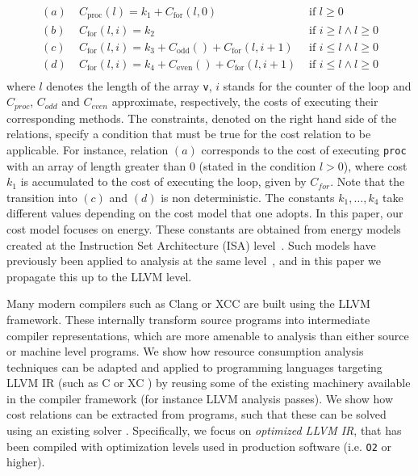 \documentclass[9pt,preprint]{sigplanconf}
\newcommand{\mathspace}[1]{\ensuremath{#1}\xspace}
\newcommand{\CR}[1]{\mathspace{C_{\operatorname{#1}}}}
\begin{document}
\begin{align*}
(a)&\phantom .\CR{proc}(l)=k_1+\CR{for}(l,0) &\text{ if }l\geq 0\\
(b)&\phantom .\CR{for}(l,i)=k_2         &\text{ if }i\geq l \wedge l\geq 0\\
(c)&\phantom .\CR{for}(l,i)=k_3+\CR{odd}() + \CR{for}(l,i+1) &\text{ if }i\leq l \wedge l\geq 0\\
(d)&\phantom .\CR{for}(l,i)=k_4+\CR{even}() + \CR{for}(l,i+1) &\text{ if }i\leq l \wedge l\geq 0\\
\end{align*}
where $l$ denotes the length of the array \texttt{v}, $i$ stands for the counter of the
loop and $C_{proc}$, $C_{odd}$ and $C_{even}$ approximate, respectively, the
costs of executing their corresponding methods. The constraints, denoted on the
right hand side of the relations, specify a condition that must be true for the
cost relation to be applicable. For instance, relation $(a)$
corresponds to the cost of executing \texttt{proc} with an array of length
greater than 0 (stated in the condition $l > 0$), where cost $k_1$ is
accumulated to the cost of executing the loop, given by $C_{for}$. Note that the
transition into $(c)$ and $(d)$ is non deterministic. The constants
$k_1,\ldots,k_4$ take different values depending on the cost model that one
adopts. In this paper, our cost model focuses on energy. These constants are
obtained from energy models created at the Instruction Set Architecture (ISA)
level~\cite{Kerrison13}. Such models have previously been applied to analysis at
the same level~\cite{NMHLFM08, isa-energy-lopstr13}, and in this paper we
propagate this up to the LLVM level.

Many modern compilers such as Clang or XCC are built using the LLVM framework. These
internally transform source programs into intermediate compiler representations,
which are more amenable to analysis than either source or machine level
programs. We show
how resource consumption analysis techniques can be adapted and applied to
programming languages targeting LLVM IR (such as C or XC \cite{xc}) by reusing some of the
existing machinery available in the compiler framework (for
instance LLVM analysis passes).
We show how cost relations  can be extracted from programs, such that these can
be solved using an existing solver \cite{AlbertAGP11a}. Specifically, we focus on
\emph{optimized LLVM IR}, that has been compiled with optimization levels
used in production software (i.e. \texttt{O2} or higher).
\end{document}
